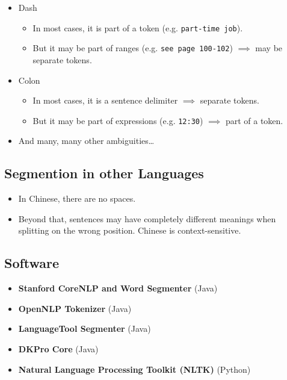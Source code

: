 \documentclass[a4paper, 11pt, accentcolor = tud3b]{tudreport}
\begin{document}
\begin{itemize}
\begin{itemize}
                    		\end{itemize}
                    	\item Dash
                    		\begin{itemize}
                    			\item In most cases, it is part of a token (e.g. \texttt{part-time job}).
                    			\item But it may be part of ranges (e.g. \texttt{see page 100-102}) \(\implies\) may be separate tokens.
                    		\end{itemize}
                    	\item Colon
                    		\begin{itemize}
                    			\item In most cases, it is a sentence delimiter \(\implies\) separate tokens.
                    			\item But it may be part of expressions (e.g. \texttt{12:30}) \(\implies\) part of a token.
                    		\end{itemize}
                    	\item And many, many other ambiguities\dots
                    \end{itemize}

            \subsection{Segmention in other Languages} %
            	\begin{itemize}
            		\item In Chinese, there are no spaces.
            		\item Beyond that, sentences may have completely different meanings when splitting on the wrong position. Chinese is context-sensitive.
            	\end{itemize}

            \subsection{Software} %
                \begin{itemize}
                	\item \textbf{Stanford CoreNLP and Word Segmenter} (Java)
                	\item \textbf{OpenNLP Tokenizer} (Java)
                	\item \textbf{LanguageTool Segmenter} (Java)
                	\item \textbf{DKPro Core} (Java)
                	\item \textbf{Natural Language Processing Toolkit (NLTK)} (Python)
                \end{itemize}
\end{document}
